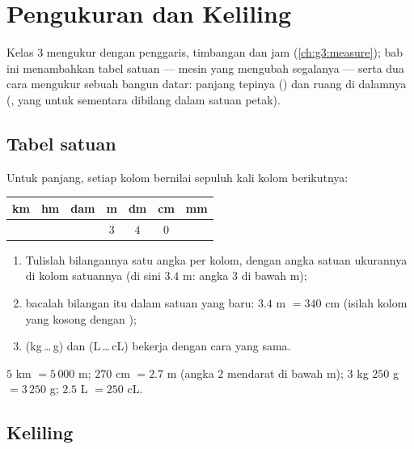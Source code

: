 \chapter{Pengukuran dan Keliling}\label{ch:g4:measure}

Kelas 3 mengukur dengan penggaris, timbangan dan jam
(\cref{ch:g3:measure}); bab ini menambahkan tabel satuan --- mesin
yang mengubah segalanya --- serta dua cara mengukur sebuah bangun
datar: panjang tepinya () dan ruang di dalamnya (, yang
untuk sementara dibilang dalam satuan petak).

\section{Tabel satuan}

\begin{method}\label{met:g4:measure:table}
Untuk panjang, setiap kolom bernilai sepuluh kali kolom berikutnya:
\begin{center}
\renewcommand{\arraystretch}{1.3}
\begin{tabular}{c|c|c|c|c|c|c}
km & hm & dam & m & dm & cm & mm \\
\hline
 & & & $3$ & $4$ & $0$ & \\
\end{tabular}
\end{center}
\begin{enumerate}
  \item Tulislah bilangannya satu angka per kolom, dengan angka
        satuan ukurannya di kolom satuannya (di sini $3.4$ m: angka
        $3$ di bawah m);
  \item bacalah bilangan itu dalam satuan yang baru: $3.4$ m
        $= 340$ cm (isilah kolom yang kosong dengan );
  \item {} (kg\,\dots\,g) dan  (L\,\dots\,cL) bekerja
        dengan cara yang sama.
\end{enumerate}
\end{method}

\begin{example}\label{ex:g4:measure:convert}
$5$ km $= 5\,000$ m; \quad $270$ cm $= 2.7$ m (angka $2$ mendarat di
bawah m); \quad $3$ kg $250$ g $= 3\,250$ g; \quad
$2.5$ L $= 250$ cL.
\end{example}

\section{Keliling}

